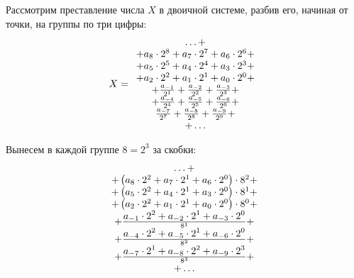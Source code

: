 Рассмотрим преставление числа $X$ в двоичной системе, разбив его, начиная от точки, на группы по три цифры:
\[
    X=
        \begin{array}[c]{c}
            \ldots+\\+
            a_{8}\cdot 2^{8} +
            a_{7}\cdot 2^{7} +
            a_{6}\cdot 2^{6} +\\+

            a_{5}\cdot 2^{5} +
            a_{4}\cdot 2^{4} +
            a_{3}\cdot 2^{3} +\\+

            a_{2}\cdot 2^{2} +
            a_{1}\cdot 2^{1} +
            a_{0}\cdot 2^{0} +\\+

            \frac {a_{-1}}{2^{1}} +
            \frac {a_{-2}}{2^{2}} +
            \frac {a_{-3}}{2^{3}} +\\+

            \frac {a_{-4}}{2^{4}} +
            \frac {a_{-5}}{2^{5}} +
            \frac {a_{-6}}{2^{6}} +\\

            \frac {a_{-7}}{2^{7}} +
            \frac {a_{-8}}{2^{8}} +
            \frac {a_{-9}}{2^{9}} +\\

            +\ldots
    \end{array}
\]

Вынесем в каждой группе $8=2^3$ за скобки:
\[
    \begin{array}[c]{c}
        \ldots+\\+
        \left(
        a_{8}\cdot 2^{2} +
        a_{7}\cdot 2^{1} +
        a_{6}\cdot 2^{0}\right)\cdot 8^{2} +\\+

        \left(
        a_{5}\cdot 2^{2} +
        a_{4}\cdot 2^{1} +
        a_{3}\cdot 2^{0}\right)\cdot 8^{1} +\\+

        \left(
        a_{2}\cdot 2^{2} +
        a_{1}\cdot 2^{1} +
        a_{0}\cdot 2^{0}\right)\cdot 8^{0} +\\+


        \frac{\displaystyle
        a_{-1}\cdot 2^{2} +
        a_{-2}\cdot 2^{1} +
        a_{-3}\cdot 2^{0}
        }{8^{1}} +\\+


        \frac{\displaystyle
        a_{-4}\cdot 2^{2} +
        a_{-5}\cdot 2^{1} +
        a_{-6}\cdot 2^{0}
        }{8^{2}} +\\+

        \frac{\displaystyle
        a_{-7}\cdot 2^{1} +
        a_{-8}\cdot 2^{2} +
        a_{-9}\cdot 2^{3}
        }{8^{3}} +\\

        +\ldots
    \end{array}
\]


